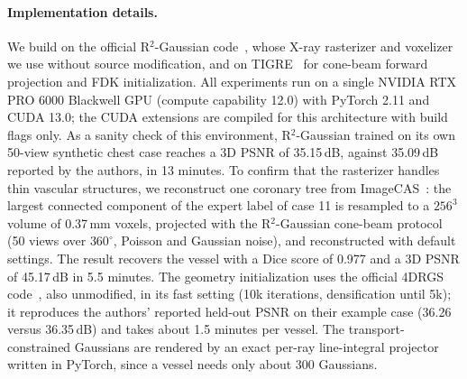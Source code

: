 
\paragraph{Implementation details.}
We build on the official R$^2$-Gaussian code~\cite{zha2024r2gaussian}, whose
X-ray rasterizer and voxelizer we use without source modification, and on
TIGRE~\cite{biguri2016tigre} for cone-beam forward projection and FDK
initialization. All experiments run on a single NVIDIA RTX PRO 6000 Blackwell
GPU (compute capability 12.0) with PyTorch 2.11 and CUDA 13.0; the CUDA
extensions are compiled for this architecture with build flags only.
As a sanity check of this environment, R$^2$-Gaussian trained on its own
50-view synthetic chest case reaches a 3D PSNR of 35.15\,dB, against
35.09\,dB reported by the authors, in 13 minutes.
To confirm that the rasterizer handles thin vascular structures, we
reconstruct one coronary tree from ImageCAS~\cite{zeng2023imagecas}: the
largest connected component of the expert label of case 11 is resampled to a
$256^3$ volume of 0.37\,mm voxels, projected with the R$^2$-Gaussian cone-beam
protocol (50 views over $360^\circ$, Poisson and Gaussian noise), and
reconstructed with default settings. The result recovers the vessel with a
Dice score of 0.977 and a 3D PSNR of 45.17\,dB in 5.5 minutes.
The geometry initialization uses the official 4DRGS
code~\cite{liu2025fourdrgs}, also unmodified, in its fast setting
(10k iterations, densification until 5k); it reproduces the authors'
reported held-out PSNR on their example case (36.26 versus 36.35\,dB) and
takes about 1.5 minutes per vessel. The transport-constrained Gaussians
are rendered by an exact per-ray line-integral projector written in
PyTorch, since a vessel needs only about 300 Gaussians.

